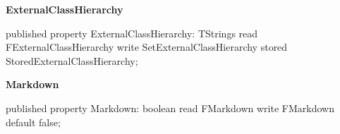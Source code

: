 \documentclass{report}
\newif\ifpdf
\begin{document}
\begin{list}{}
\begin{flushleft}
\ifpdf
\end{flushleft}
\fi


\par  \label{PasDoc_Gen.TDocGenerator-ExternalClassHierarchy}
\item[\textbf{ExternalClassHierarchy}\hfill]
\ifpdf
\begin{flushleft}
\fi
\begin{ttfamily}
published property ExternalClassHierarchy: TStrings
      read FExternalClassHierarchy write SetExternalClassHierarchy
      stored StoredExternalClassHierarchy;\end{ttfamily}

\ifpdf
\end{flushleft}
\fi


\par  \label{PasDoc_Gen.TDocGenerator-Markdown}
\item[\textbf{Markdown}\hfill]
\ifpdf
\begin{flushleft}
\fi
\begin{ttfamily}
published property Markdown: boolean
      read FMarkdown write FMarkdown default false;\end{ttfamily}

\ifpdf
\end{flushleft}
\fi


\par  \end{list}
\end{document}
